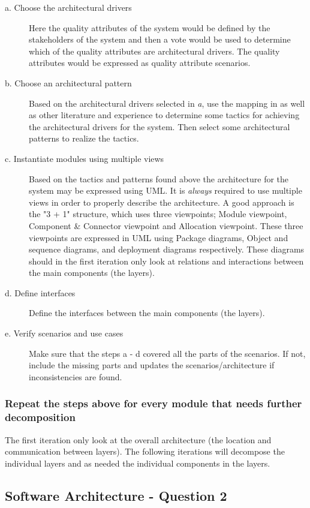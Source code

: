 \begin{description}
    \item[a. Choose the architectural drivers]
  Here the quality attributes of the system would be defined by the stakeholders of the system and then a vote would be used to determine which of the quality attributes are architectural drivers. The quality attributes would be expressed as quality attribute scenarios.
    \item[b. Choose an architectural pattern]
  Based on the architectural drivers selected in \emph{a}, use the mapping in \cite{bass2003sa} as well as other literature and experience to determine some tactics for achieving the architectural drivers for the system. Then select some architectural patterns to realize the tactics.
    \item[c. Instantiate modules using multiple views]
  Based on the tactics and patterns found above the architecture for the system may be expressed using UML. It is \emph{always} required to use multiple views in order to properly describe the architecture. A good approach is the "3 + 1" structure, which uses three viewpoints; Module viewpoint, Component \& Connector viewpoint and Allocation viewpoint. These three viewpoints are expressed in UML using Package diagrams, Object and sequence diagrams, and deployment diagrams respectively. These diagrams should in the first iteration only look at relations and interactions between the main components (the layers).
    \item[d. Define interfaces]
  Define the interfaces between the main components (the layers).
    \item[e. Verify scenarios and use cases]
  Make sure that the steps a - d covered all the parts of the scenarios. If not, include the missing parts and updates the scenarios/architecture if inconsistencies are found.
\end{description}
\subsubsection{Repeat the steps above for every module that needs further decomposition}
The first iteration only look at the overall architecture (the location and communication between layers). The following iterations will decompose the individual layers and as needed the individual components in the layers.

\subsection{Software Architecture - Question 2}

